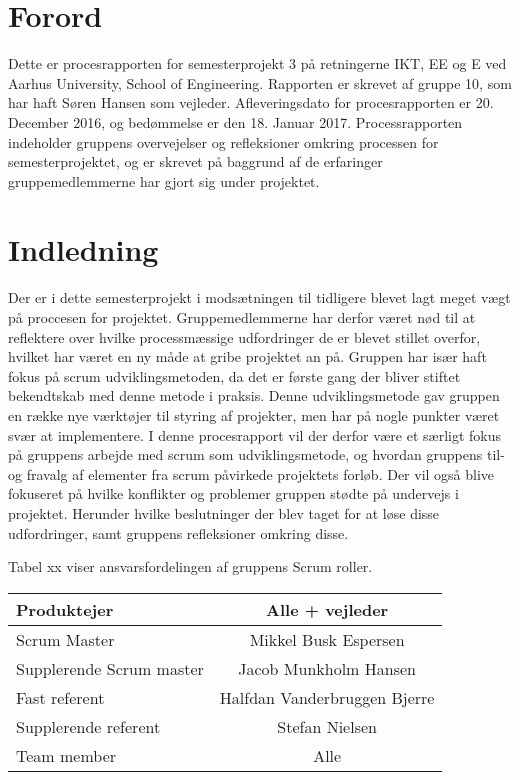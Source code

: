 \chapter{Forord}
Dette er procesrapporten for semesterprojekt 3 på retningerne IKT, EE og E ved Aarhus University, School of Engineering. Rapporten er skrevet af gruppe 10, som har haft Søren Hansen som vejleder. Afleveringsdato for procesrapporten er 20. December 2016, og bedømmelse er den 18. Januar 2017. Processrapporten indeholder gruppens overvejelser og refleksioner omkring processen for semesterprojektet, og er skrevet på baggrund af de erfaringer gruppemedlemmerne har gjort sig under projektet.    

\chapter{Indledning}
Der er i dette semesterprojekt i modsætningen til tidligere blevet lagt meget vægt på proccesen for projektet. Gruppemedlemmerne har derfor været nød til at reflektere over hvilke processmæssige udfordringer de er blevet stillet overfor, hvilket har været en ny måde at gribe projektet an på. Gruppen har især haft fokus på scrum udviklingsmetoden, da det er første gang der bliver stiftet bekendtskab med denne metode i praksis. Denne udviklingsmetode gav gruppen en række nye værktøjer til styring af projekter, men har på nogle punkter været svær at implementere. I denne procesrapport vil der derfor være et særligt fokus på gruppens arbejde med scrum som udviklingsmetode, og hvordan gruppens til- og fravalg af elementer fra scrum påvirkede projektets forløb. Der vil også blive fokuseret på hvilke konflikter og problemer gruppen stødte på undervejs i projektet. Herunder hvilke beslutninger der blev taget for at løse disse udfordringer, samt gruppens refleksioner omkring disse.

Tabel xx viser ansvarsfordelingen af gruppens Scrum roller. \\

\begin{tabular}{| l | c |}
\hline
Produktejer & Alle + vejleder\\\hline
Scrum Master & Mikkel Busk Espersen\\\hline
Supplerende Scrum master & Jacob Munkholm Hansen\\\hline
Fast referent & Halfdan Vanderbruggen Bjerre\\\hline
Supplerende referent & Stefan Nielsen\\\hline
Team member & Alle\\\hline
\end{tabular}

